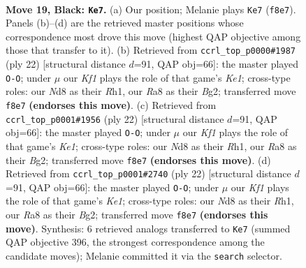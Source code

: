 \documentclass[11pt]{article}
\begin{document}
\clearpage

\begin{figure}[p]\centering
\begin{subfigure}{0.46\textwidth}\centering
\resizebox{\linewidth}{!}{%
\newchessgame
\chessboard[
  setfen={r1bnrk2/1ppp1ppp/p2q4/B2P4/4n3/4PNP1/PP3PBP/1R1QR1K1 b - - 14 19},
  showmover=false,
  pgfstyle=straightmove, color=movearrow, markmove={f8-e7}
]}
\caption{}
\end{subfigure}\hfill
\begin{subfigure}{0.46\textwidth}\centering
\resizebox{\linewidth}{!}{%
\newchessgame
\chessboard[
  setfen={rn1q1rk1/pb3p1p/1pp2bp1/3p4/Q2P4/P1N2NP1/1P2PPBP/R3K2R w KQ - 0 12},
  showmover=false,
  pgfstyle=straightmove, color=movearrow, markmove={e1-g1}
]}
\caption{}
\end{subfigure}
\\[4pt]
\begin{subfigure}{0.46\textwidth}\centering
\resizebox{\linewidth}{!}{%
\newchessgame
\chessboard[
  setfen={rn1q1rk1/pb3p1p/1pp2bp1/3p4/Q2P4/P1N2NP1/1P2PPBP/R3K2R w KQ - 2 12},
  showmover=false,
  pgfstyle=straightmove, color=movearrow, markmove={e1-g1}
]}
\caption{}
\end{subfigure}\hfill
\begin{subfigure}{0.46\textwidth}\centering
\resizebox{\linewidth}{!}{%
\newchessgame
\chessboard[
  setfen={rn1q1rk1/pb3p1p/1pp2bp1/3p4/Q2P4/P1N2NP1/1P2PPBP/R3K2R w KQ - 0 12},
  showmover=false,
  pgfstyle=straightmove, color=movearrow, markmove={e1-g1}
]}
\caption{}
\end{subfigure}
\caption{\textbf{Move 19, Black: \texttt{Ke7}.} (a) Our position; Melanie plays \texttt{Ke7} (\texttt{f8e7}). Panels (b)--(d) are the retrieved master positions whose correspondence most drove this move (highest QAP objective among those that transfer to it). (b) Retrieved from \texttt{ccrl\_top\_p0000\#1987} (ply 22) [structural distance $d$=91, QAP obj=66]: the master played \texttt{O-O}; under $\mu$ our \emph{Kf1} plays the role of that game's \emph{Ke1}; cross-type roles: our \emph{N}d8 as their \emph{R}h1, our \emph{R}a8 as their \emph{B}g2; transferred move \texttt{f8e7} \textbf{(endorses this move)}. (c) Retrieved from \texttt{ccrl\_top\_p0001\#1956} (ply 22) [structural distance $d$=91, QAP obj=66]: the master played \texttt{O-O}; under $\mu$ our \emph{Kf1} plays the role of that game's \emph{Ke1}; cross-type roles: our \emph{N}d8 as their \emph{R}h1, our \emph{R}a8 as their \emph{B}g2; transferred move \texttt{f8e7} \textbf{(endorses this move)}. (d) Retrieved from \texttt{ccrl\_top\_p0001\#2740} (ply 22) [structural distance $d$=91, QAP obj=66]: the master played \texttt{O-O}; under $\mu$ our \emph{Kf1} plays the role of that game's \emph{Ke1}; cross-type roles: our \emph{N}d8 as their \emph{R}h1, our \emph{R}a8 as their \emph{B}g2; transferred move \texttt{f8e7} \textbf{(endorses this move)}. Synthesis: 6 retrieved analogs transferred to \texttt{Ke7} (summed QAP objective 396, the strongest correspondence among the candidate moves); Melanie committed it via the \texttt{search} selector.}
\label{fig:thought-m37}
\end{figure}
\end{document}
